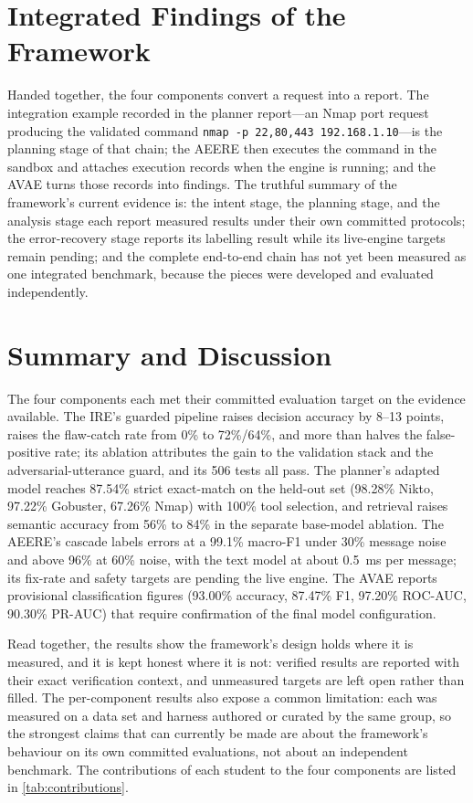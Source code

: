 \section{Integrated Findings of the Framework}\label{sec:results-integrated}

Handed together, the four components convert a request into a report. The
integration example recorded in the planner report---an Nmap port request
producing the validated command \texttt{nmap -p 22,80,443 192.168.1.10}---is the
planning stage of that chain; the AEERE then executes the command in the sandbox
and attaches execution records when the engine is running; and the AVAE turns
those records into findings. The truthful summary of the framework's current
evidence is: the intent stage, the planning stage, and the analysis stage each
report measured results under their own committed protocols; the error-recovery
stage reports its labelling result while its live-engine targets remain pending;
and the complete end-to-end chain has not yet been measured as one integrated
benchmark, because the pieces were developed and evaluated independently.

\section{Summary and Discussion}\label{sec:results-discussion}

The four components each met their committed evaluation target on the evidence
available. The IRE's guarded pipeline raises decision accuracy by 8--13 points,
raises the flaw-catch rate from 0\% to 72\%/64\%, and more than halves the
false-positive rate; its ablation attributes the gain to the validation stack
and the adversarial-utterance guard, and its 506 tests all pass. The planner's
adapted model reaches 87.54\% strict exact-match on the held-out set (98.28\%
Nikto, 97.22\% Gobuster, 67.26\% Nmap) with 100\% tool selection, and retrieval
raises semantic accuracy from 56\% to 84\% in the separate base-model ablation.
The AEERE's cascade labels errors at a 99.1\% macro-F1 under 30\% message noise
and above 96\% at 60\% noise, with the text model at about 0.5~ms per message;
its fix-rate and safety targets are pending the live engine. The AVAE reports
provisional classification figures (93.00\% accuracy, 87.47\% F1, 97.20\%
ROC-AUC, 90.30\% PR-AUC) that require confirmation of the final model
configuration.

Read together, the results show the framework's design holds where it is
measured, and it is kept honest where it is not: verified results are reported
with their exact verification context, and unmeasured targets are left open
rather than filled. The per-component results also expose a common limitation:
each was measured on a data set and harness authored or curated by the same
group, so the strongest claims that can currently be made are about the
framework's behaviour on its own committed evaluations, not about an independent
benchmark. The contributions of each student to the four components are listed
in \cref{tab:contributions}.

